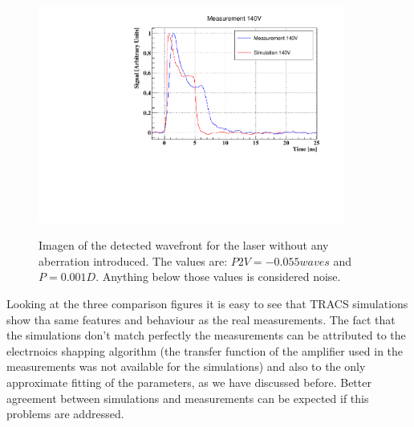 \begin{figure}[h]
	\centering
	\includegraphics[width=0.9\textwidth]{140V.png}
	\label{fig:mues2}
	\caption{Imagen of the detected wavefront for the laser without any aberration introduced. The values are: $P2V = -0.055waves$ and $P = 0.001D$. Anything below those values is considered noise.}
\end{figure}

Looking at the three comparison figures it is easy to see that TRACS simulations show tha same features and behaviour as the real measurements. The fact that the simulations don't match perfectly the measurements can be attributed to the electrnoics shapping algorithm (the transfer function of the amplifier used in the measurements was not available for the simulations) and also to the only approximate fitting of the parameters, as we have discussed before. Better agreement between simulations and measurements can be expected if this problems are addressed.

